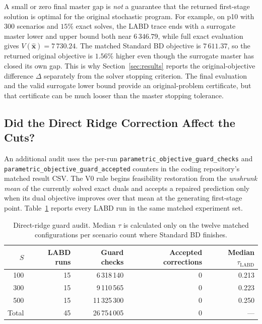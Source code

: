 A small or zero final master gap is \emph{not} a guarantee that the returned first-stage solution is optimal for the original stochastic program. For example, on p10 with 300 scenarios and $15\%$ exact solves, the LABD trace ends with a surrogate master lower and upper bound both near $6\,346.79$, while full exact evaluation gives $V(\widehat{\mathbf x})=7\,730.24$. The matched Standard BD objective is $7\,611.37$, so the returned original objective is $1.56\%$ higher even though the surrogate master has closed its own gap. This is why Section~\ref{sec:results} reports the original-objective difference $\Delta$ separately from the solver stopping criterion. The final evaluation and the valid surrogate lower bound provide an original-problem certificate, but that certificate can be much looser than the master stopping tolerance.

\subsection{Did the Direct Ridge Correction Affect the Cuts?}\label{app:trace-guard}

An additional audit uses the per-run \texttt{parametric\_objective\_guard\_checks} and \texttt{parametric\_objective\_guard\_accepted} counters in the coding repository's matched result CSV. The V0 rule begins feasibility restoration from the \emph{unshrunk mean} of the currently solved exact duals and accepts a repaired prediction only when its dual objective improves over that mean at the generating first-stage point. Table~\ref{tab:trace-guard} reports every LABD run in the same matched experiment set.

\begin{table}[ht]
\centering
\caption{Direct-ridge guard audit. Median $\tau$ is calculated only on the twelve matched configurations per scenario count where Standard BD finishes.}
\label{tab:trace-guard}
\scriptsize
\setlength{\tabcolsep}{6pt}
\begin{tabular}{r r r r r}
\toprule
$S$ & LABD runs & Guard checks & Accepted corrections & Median $\tau_{\mathrm{LABD}}$\\
\midrule
100 & 15 & 6\,318\,140  & 0 & 0.213\\
300 & 15 & 9\,110\,565  & 0 & 0.223\\
500 & 15 & 11\,325\,300 & 0 & 0.250\\
\midrule
Total & 45 & 26\,754\,005 & 0 & ---\\
\bottomrule
\end{tabular}
\end{table}

